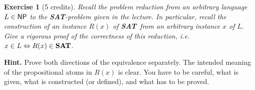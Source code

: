 \documentclass [11pt]{article}
\newtheorem{exercise}[theorem]{Exercise}
\newcommand{\LR}{\Leftrightarrow}
\newcommand{\ccfont}[1]{\protect\mathsf{#1}}
\newcommand{\NP}{\ccfont{NP}}
\newcommand{\SAT}{\mbox{\bf SAT}}
\begin{document}


\medskip

\noindent
\begin{exercise}[5 credits]
{\em Recall the problem reduction from an arbitrary language $L \in \NP$ 
to the \SAT-problem given in the lecture. 
In particular, recall the construction of an instance $R(x)$ of
\SAT\ from an arbitrary instance $x$ of $L$.
Give a rigorous proof of the correctness of this reduction, i.e.
$x \in L \LR R(x) \in \SAT$.
} %
\end{exercise}


\noindent
{\bf Hint.} Prove both directions of the equivalence separately. 
The intended meaning of
the propositional atoms in $R(x)$ is clear. You have to be careful, what is given, what is constructed (or defined), and what has to be proved. 
\end{document}
